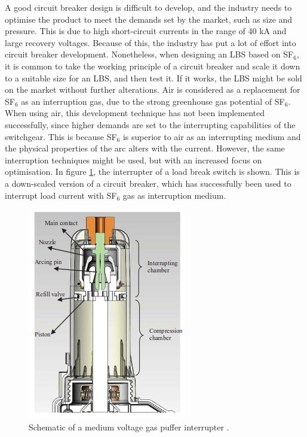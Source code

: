 \documentclass[10pt,b5paper,twoside]{article}
\begin{document}
A good circuit breaker design is difficult to develop, and the industry needs to optimise the product to meet the demands set by the market, such as size and pressure. This is due to high short-circuit currents in the range of 40 kA and large recovery voltages. Because of this, the industry has put a lot of effort into circuit breaker development. Nonetheless, when designing an LBS based on SF$_6$, it is common to take the working principle of a circuit breaker and scale it down to a suitable size for an LBS, and then test it. If it works, the LBS might be sold on the market without further alterations. Air is considered as a replacement for SF$_6$ as an interruption gas, due to the strong greenhouse gas potential of SF$_6$. When using air, this development technique has not been implemented successfully, since higher demands are set to the interrupting capabilities of the switchgear. This is because SF$_6$ is superior to air as an interrupting medium and the physical properties of the arc alters with the current. However, the same interruption techniques might be used, but with an increased focus on optimisation. In figure \ref{fig:selfBlastandPuffer}, the interrupter of a load break switch is shown. This is a down-scaled version of a circuit breaker, which has successfully been used to interrupt load current with SF$_6$ gas as interruption medium. 

\begin{figure} [H]
\centering
\includegraphics[scale=0.6]{Bilder/Theory/LBSselfblastandPuffer.png}
\caption{Schematic of a medium voltage gas puffer interrupter \cite{bib:CBAC}.} \label{fig:selfBlastandPuffer}
\end{figure}
\end{document}
